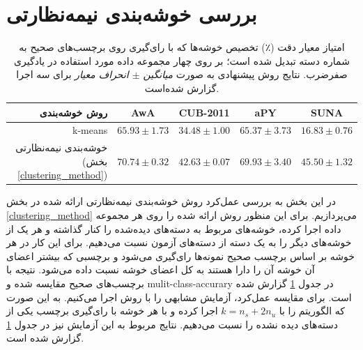 \section{بررسی خوشه‌بندی نیمه‌نظارتی}
\begin{table}[ht]
\centering
\caption[بررسی عمل‌کرد خوشه‌بندی نیمه‌نظارتی پیشنهاتی]{
امتیاز معیار دقت (٪) تخصیص خوشه‌ها که با رای‌گیری روی برچسب‌های صحیح به شماره دسته تبدیل شده است؛ بر روی چهار مجموعه داده مورد استفاده در یادگیری صفرضرب. نتایج روش پیشنهادی به صورت
\textit{ میانگین $\pm$ انحراف معیار }
برای سه اجرا گزارش شده‌است.}
\vspace*{2mm}
  \label{tab:clustering}
\begin{tabular}{|r|c|c|c|c|}
\hline
روش خوشه‌بندی & AwA & CUB-2011 & aPY & SUNA \\
\hline
k-means                             &  ${65.93 \pm 1.73}$                 & ${34.48 \pm 1.00}$           & ${65.37 \pm 3.73 }$               & ${16.83 \pm 0.76 }$   \\
\hline
خوشه‌بندی نیمه‌نظارتی (بخش \ref{clustering_method})
                      & \textbf{${70.74\pm 0.32}$}  & \textbf{${42.63\pm 0.07}$} & \textbf{${69.93\pm 3.40}$} & \textbf{ ${45.50 \pm 1.32}$} \\
\hline
\end{tabular}
\vspace{2mm}
\end{table}

در این بخش به بررسی عمل‌کرد روش خوشه‌بندی نیمه‌نظارتی ارائه شده در بخش \ref{clustering_method} می‌پردازیم. برای این منظور روش ارائه شده را روی هر مجموعه داده اجرا کرده، خوشه‌های مربوط به دسته‌های دیده‌شده را کنار گذاشته  و هر یک از خوشه‌های دیگر را به یک دسته از دسته‌های آزمون نسبت می‌دهیم. برای این کار در هر خوشه بر اساس برچسب صحیح نمونه‌ها رای‌گیری می‌شود و برچسبی که بیشتر اعضای آن خوشه آن را دارا هستند به کل اعضای خوشه نسبت داده می‌شود. نتیجه با برچسب‌های صحیح مقایسه شده و \gls{mulit-class-accurary} در جدول \ref{tab:clustering} گزارش شده است.
 برای مقایسه عمل‌کرد، آزمایش مشابهی را با روش  اجرا می‌کنیم. به این صورت که  الگوریتم  را با $k=n_s + 2n_u$ اجرا کرده و با هر خوشه با رای‌گیری برچسب یکی از دسته‌های دیده نشده را نسبت می‌دهیم. نتایج مربوط به این آزمایش نیز در جدول \ref{tab:clustering} گزارش شده است.

